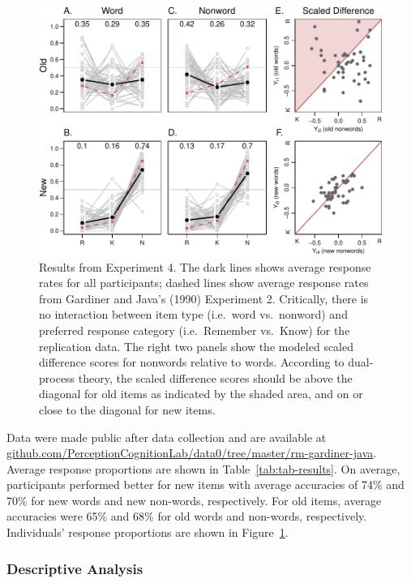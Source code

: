 \documentclass[english,,man,floatsintext]{apa6}
\begin{document}
\begin{figure}
\centering
\includegraphics{p_files/figure-latex/results-4-1.pdf}
\caption{\label{fig:results-4}Results from Experiment 4. The dark lines shows average response rates for all participants; dashed lines show average response rates from Gardiner and Java's (1990) Experiment 2. Critically, there is no interaction between item type (i.e.~word vs.~nonword) and preferred response category (i.e.~Remember vs.~Know) for the replication data. The right two panels show the modeled scaled difference scores for nonwords relative to words. According to dual-process theory, the scaled difference scores should be above the diagonal for old items as indicated by the shaded area, and on or close to the diagonal for new items.}
\end{figure}

Data were made public after data collection and are available at \href{https://github.com/PerceptionCognitionLab/data0/tree/master/rm-gardiner-java}{github.com/PerceptionCognitionLab/data0/tree/master/rm-gardiner-java}.
Average response proportions are shown in Table~\ref{tab:tab-results}. On average, participants performed better for new items with average accuracies of 74\% and 70\% for new words and new non-words, respectively. For old items, average accuracies were 65\% and 68\% for old words and non-words, respectively. Individuals' response proportions are shown in Figure~\ref{fig:results-4}.

\hypertarget{descriptive-analysis-3}{%
\subsubsection{Descriptive Analysis}\label{descriptive-analysis-3}}
\end{document}
